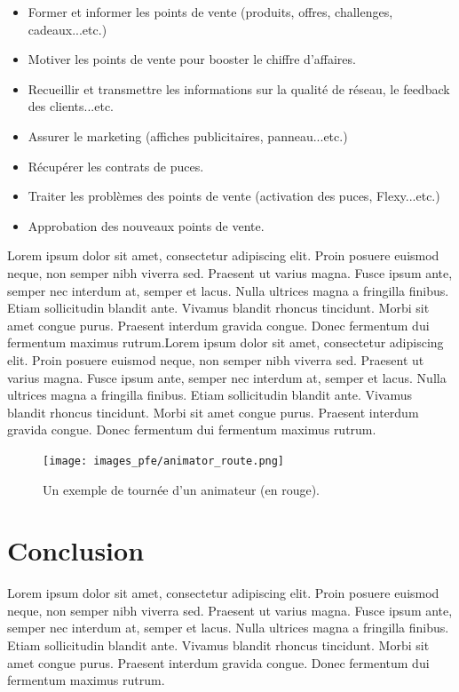 \medskip

\begin{itemize}
    \item Former et informer les points de vente (produits, offres, challenges, cadeaux...etc.)
    \item Motiver les points de vente pour booster le chiffre d’affaires.
    \item Recueillir et transmettre les informations sur la qualité de réseau, le feedback des clients...etc.
    \item Assurer le marketing (affiches publicitaires, panneau...etc.)
    \item Récupérer les contrats de puces.
    \item Traiter les problèmes des points de vente (activation des puces, Flexy...etc.)
    \item Approbation des nouveaux points de vente.
\end{itemize}

Lorem ipsum dolor sit amet, consectetur adipiscing elit. Proin posuere euismod neque, non semper nibh viverra sed. Praesent ut varius magna. Fusce ipsum ante, semper nec interdum at, semper et lacus. Nulla ultrices magna a fringilla finibus. Etiam sollicitudin blandit ante. Vivamus blandit rhoncus tincidunt. Morbi sit amet congue purus. Praesent interdum gravida congue. Donec fermentum dui fermentum maximus rutrum.Lorem ipsum dolor sit amet, consectetur adipiscing elit. Proin posuere euismod neque, non semper nibh viverra sed. Praesent ut varius magna. Fusce ipsum ante, semper nec interdum at, semper et lacus. Nulla ultrices magna a fringilla finibus. Etiam sollicitudin blandit ante. Vivamus blandit rhoncus tincidunt. Morbi sit amet congue purus. Praesent interdum gravida congue. Donec fermentum dui fermentum maximus rutrum.

\medskip

\begin{figure}[hbt!]
  \centering
  \texttt{[image: images\_pfe/animator\_route.png]}
  \caption{Un exemple de tournée d'un animateur (en rouge).}
  \label{fig:tournee-animateur}
\end{figure}
\FloatBarrier


\medskip

\section{Conclusion}
Lorem ipsum dolor sit amet, consectetur adipiscing elit. Proin posuere euismod neque, non semper nibh viverra sed. Praesent ut varius magna. Fusce ipsum ante, semper nec interdum at, semper et lacus. Nulla ultrices magna a fringilla finibus. Etiam sollicitudin blandit ante. Vivamus blandit rhoncus tincidunt. Morbi sit amet congue purus. Praesent interdum gravida congue. Donec fermentum dui fermentum maximus rutrum.


